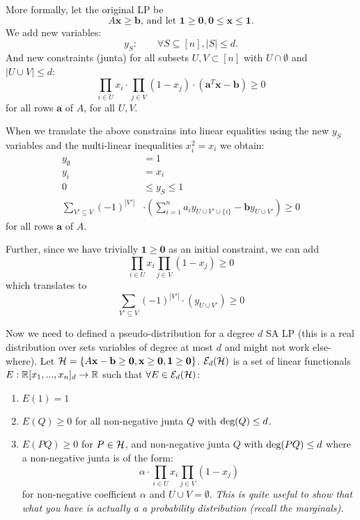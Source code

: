 More formally, let the original LP be 
\[A\mathbf{x} \geq \mathbf{b} \mbox{, and let } \mathbf{1} \geq \mathbf{0}, \mathbf{0} \leq \mathbf{x} \leq \mathbf{1}.\] 
We add new variables:
\[y_S: \qquad\forall S \subseteq [n], |S| \leq d.\]
And new constraints (junta) for all subsets $U, V \subset [n]$ with $U \cap \emptyset$ and $|U \cup V| \leq d$:
\[\prod_{i \in U}x_i \cdot \prod_{j \in V}(1 - x_j) \cdot (\mathbf{a}^T\mathbf{x} - \mathbf{b}) \geq 0 \]
for all rows $\mathbf{a}$ of $A$, for all $U, V$.

When we translate the above constrains into linear equalities using the new $y_S$ variables and the multi-linear inequalities $x_i^2 = x_i$ we obtain:
\begin{align*}
y_{\emptyset} &= 1\\
y_{i} &= x_i\\
0 &\leq y_{S} \leq 1\\
\sum_{V' \subseteq V} (-1)^{|V'|} &\cdot \left(\sum_{i = 1}^n a_i y_{U \cup V' \cup \{i\}} - \mathbf{b}y_{U \cup V'}\right) \geq 0
\end{align*}
for all rows $\mathbf{a}$ of $A$.

Further, since we have trivially $\mathbf{1} \geq \mathbf{0}$ as an initial constraint, we can add
\[\prod_{i \in U}x_i \prod_{j \in V}(1-x_j) \geq 0\]
which translates to 
\[\sum_{V' \subseteq V}(-1)^{|V'|}\cdot \left(y_{U \cup V'}\right) \geq 0\]

Now we need to defined a pseudo-distribution for a degree $d$ SA LP (this is a real distribution over sets variables of degree at most $d$ and might not work else-where). Let $\mathcal{H} = \{A\mathbf{x} - \mathbf{b} \geq \mathbf{0}, \mathbf{x} \geq \mathbf{0}, \mathbf{1} \geq \mathbf{0}\}$. $\mathcal{E}_{d}(\mathcal{H})$ is a set of linear functionals $E: \mathbb{R}[x_1, ..., x_n]_d \rightarrow \mathbb{R}$ such that $\forall E \in \mathcal{E}_{d}(\mathcal{H})$:
\begin{enumerate}
\item $E(1) = 1$
\item $E(Q) \geq 0$ for all non-negative junta $Q$ with $\mbox{deg}(Q) \leq d$. 
\item $E(PQ) \geq 0$ for $P \in \mathcal{H}$, and non-negative junta $Q$ with $\mbox{deg}(PQ) \leq d$ where a non-negative junta is of the form:
\[\alpha \cdot \prod_{i \in U}x_i \prod_{j \in V}(1-x_j)\]
for non-negative coefficient $\alpha$ and $U \cup V = \emptyset$. \emph{This is quite useful to show that what you have is actually a a probability distribution (recall the marginals).}
\end{enumerate}

